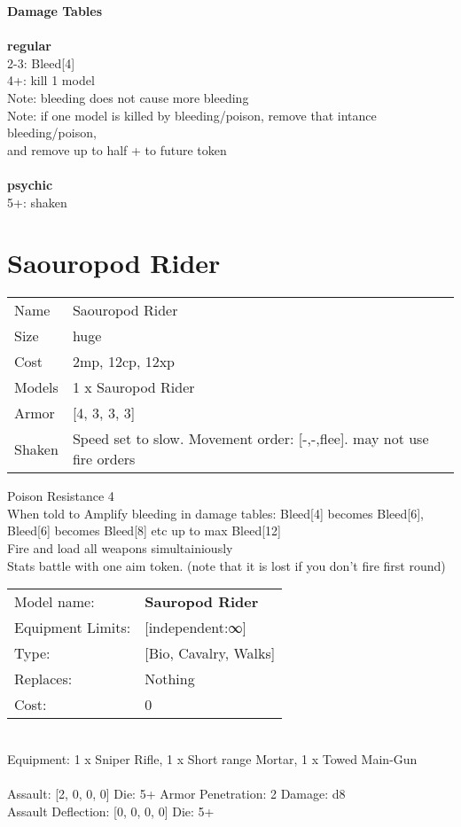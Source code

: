 {\bf Damage Tables} \\
\ \\ {\bf regular } \\
2-3: Bleed[4] \\
4+: kill 1 model \\
Note: bleeding does not cause more bleeding \\
Note: if one model is killed by bleeding/poison, remove that intance bleeding/poison, \\ and remove up to half + to future token \\
\ \\ {\bf psychic } \\
5+: shaken \\










\pagebreak\pagebreak

\section{ Saouropod Rider }

\begin{tabular}{ll}
  Name & Saouropod Rider \\
  Size & huge\\
  Cost & 2mp, 12cp, 12xp\\
  Models & 1 x Sauropod Rider\\
  Armor & [4, 3, 3, 3]\\
  Shaken & Speed set to slow. Movement order: [-,-,flee]. may not use fire orders\\
\end{tabular}

\noindent Poison Resistance 4\\ 
When told to Amplify bleeding in damage tables: Bleed[4] becomes Bleed[6], Bleed[6] becomes Bleed[8] etc up to max Bleed[12]\\ 
Fire and load all weapons simultainiously\\ 
Stats battle with one aim token. (note that it is lost if you don't fire first round)\\ 


\noindent
\begin{tabular}{ll}
Model name: &{\bf Sauropod Rider } \\
Equipment Limits: &[independent:∞] \\
Type: &[Bio, Cavalry, Walks] \\
Replaces: &Nothing \\
Cost: & 0\\
\end{tabular}
\ \\
Equipment: 1 x Sniper Rifle, 1 x Short range Mortar, 1 x Towed Main-Gun \\
\ \\
Assault: [2, 0, 0, 0] Die: 5+ Armor Penetration: 2 Damage: d8 \\
Assault Deflection: [0, 0, 0, 0] Die: 5+\\
\indent  
\ \\

